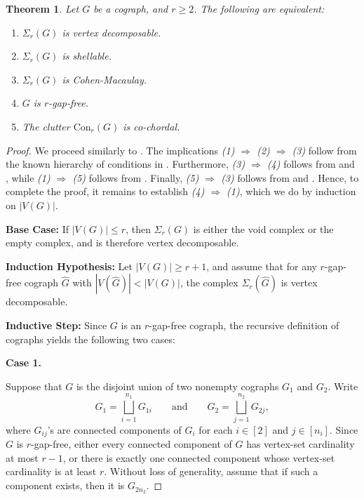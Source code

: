 \documentclass[12pt,reqno]{amsart}
\newtheorem{theorem}[proposition]{Theorem}
\theoremstyle{definition}
\newcommand{\Con}{{\mathrm{Con}}}
\begin{document}
\begin{theorem}\label{V.D of Sigma_r(G) if G is cograph}
		Let $G$ be a cograph, and $r \geq 2$. The following are equivalent:
		\begin{enumerate}        
			\item $\Sigma_r(G)$ is vertex decomposable.
			\item $\Sigma_r(G)$ is shellable.
			\item $\Sigma_r(G)$ is Cohen-Macaulay.
			\item $G$ is $r$-gap-free.
			\item The clutter $\Con_r(G)$ is co-chordal.
		\end{enumerate}
	\end{theorem}
\begin{proof}
We proceed similarly to . The implications \emph{(1) $\Rightarrow$ (2) $\Rightarrow$ (3)} follow from the known hierarchy of conditions in . Furthermore, \emph{(3) $\Rightarrow$ (4)} follows from \cite[Theorem 3]{EagonReiner1998} and \cite[Theorem 1.4]{HaWoodroofe2014}, while \emph{(1) $\Rightarrow$ (5)} follows from . Finally, \emph{(5) $\Rightarrow$ (3)} follows from \cite[Theorem 3.3]{SBCC} and \cite[Theorem 3]{EagonReiner1998}. Hence, to complete the proof, it remains to establish \emph{(4) $\Rightarrow$ (1)}, which we do by induction on $|V(G)|$.

\medskip
\noindent
{\bf Base Case:} If $|V(G)| \le r$, then $\Sigma_r(G)$ is either the void complex or the empty complex, and is therefore vertex decomposable.

\medskip
\noindent
{\bf Induction Hypothesis:} Let $|V(G)| \ge r+1$, and assume that for any $r$-gap-free cograph $\widehat G$ with $|V(\widehat G)| < |V(G)|$, the complex $\Sigma_r(\widehat G)$ is vertex decomposable.

\medskip
\noindent
{\bf Inductive Step:} Since $G$ is an $r$-gap-free cograph, the recursive definition of cographs yields the following two cases:

\medskip
\noindent
\textbf{Case 1.} 

Suppose that $G$ is the disjoint union of two nonempty cographs $G_1$ and $G_2$. Write
\[
G_1 = \bigsqcup_{i=1}^{n_1} G_{1i}
\qquad\text{and}\qquad
G_2 = \bigsqcup_{j=1}^{n_2} G_{2j},
\]
where $G_{ij}$'s are connected components of $G_i$ for each $i\in[2]$ and $j\in [n_i]$. Since $G$ is $r$-gap-free, either every connected component of $G$ has vertex-set cardinality at most $r-1$, or there is exactly one connected component whose vertex-set cardinality is at least $r$. Without loss of generality, assume that if such a component exists, then it is $G_{2n_2}$.


\end{proof}
\end{document}
